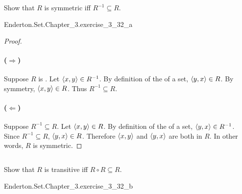 \documentclass{report}
\begin{document}
\subsection{}%

  Show that $R$ is symmetric iff $R^{-1} \subseteq R$.

    {Enderton.Set.Chapter\_3.exercise\_3\_32\_a}

  \begin{proof}

    \paragraph{($\Rightarrow$)}%

      Suppose $R$ is .
      Let $\left< x, y \right> \in R^{-1}$.
      By definition of the  of a set,
        $\left< y, x \right> \in R$.
      By symmetry, $\left< x, y \right> \in R$.
      Thus $R^{-1} \subseteq R$.

    \paragraph{($\Leftarrow$)}%

      Suppose $R^{-1} \subseteq R$.
      Let $\left< x, y \right> \in R$.
      By definition of the  of a set,
        $\left< y, x \right> \in R^{-1}$.
      Since $R^{-1} \subseteq R$, $\left< y, x \right> \in R$.
      Therefore $\left< x, y \right>$ and $\left< y, x \right>$ are both in $R$.
      In other words, $R$ is symmetric.

  \end{proof}

\subsection{}%

  Show that $R$ is transitive iff $R \circ R \subseteq R$.

    {Enderton.Set.Chapter\_3.exercise\_3\_32\_b}
\end{document}
